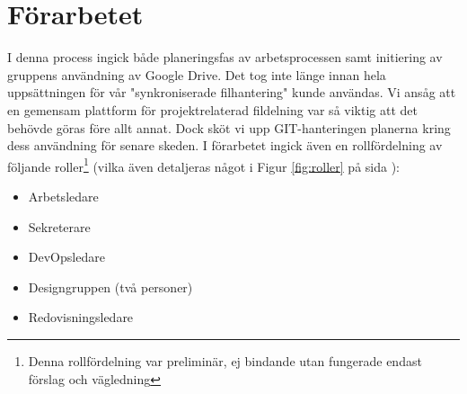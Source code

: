 \documentclass{article}
\theoremstyle{remark}                                         %
\let\sektion\section                                          %
\begin{document}
\sektion{Förarbetet}
I denna process ingick både planeringsfas av arbetsprocessen samt initiering av gruppens användning av Google Drive. Det tog inte länge innan hela uppsättningen för vår "synkroniserade filhantering" kunde användas. Vi ansåg att en gemensam plattform för projektrelaterad fildelning var så viktig att det behövde göras före allt annat. Dock sköt vi upp GIT-hanteringen planerna kring dess användning för senare skeden. I förarbetet ingick även en  rollfördelning av följande roller\footnote{Denna rollfördelning var preliminär, ej bindande utan fungerade endast förslag och vägledning} (vilka även detaljeras något i Figur \ref{fig:roller} på sida \pageref{fig:roller}): 

\begin{itemize}
    \item Arbetsledare
    \item Sekreterare
    \item DevOpsledare
    \item Designgruppen (två personer)
    \item Redovisningsledare
\end{itemize}
\end{document}
